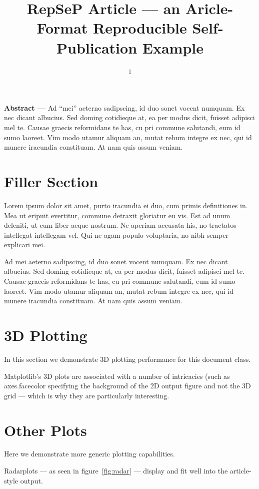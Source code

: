 \documentclass[10pt,a4paper,twocolumn,german]{article}
\title{RepSeP Article --- an Aricle-Format Reproducible Self-Publication Example}
\author{
	\authorstyle{Horea-Ioan Ioanas\textsuperscript{1}}
	\newline
	\textsuperscript{1}\institution{Institute for Biomedical Engineering, ETH and University of Zurich}
}
\date{}
\begin{document}
\maketitle
\thispagestyle{firstpage}
\noindent
\textsf{%
\textbf{Abstract ---}
Ad “mei” aeterno sadipscing, id duo sonet vocent numquam.
Ex nec dicant albucius. Sed doming cotidieque at, ea per modus dicit, fuisset adipisci mel te.
Causae graecis reformidans te has, cu pri commune salutandi, eum id sumo laoreet.
Vim modo utamur aliquam an, mutat rebum integre ex nec, qui id munere iracundia constituam.
At nam quis assum veniam.	
}

\section{Filler Section}

	Lorem ipsum dolor sit amet, purto iracundia ei duo, cum primis definitiones in.
	Mea ut eripuit evertitur, commune detraxit gloriatur eu vis.
	Est ad unum deleniti, ut cum liber aeque nostrum.
	Ne aperiam accusata his, no tractatos intellegat intellegam vel.
	Qui ne agam populo voluptaria, no nibh semper explicari mei.
	
	Ad mei aeterno sadipscing, id duo sonet vocent numquam.
	Ex nec dicant albucius. Sed doming cotidieque at, ea per modus dicit, fuisset adipisci mel te.
	Causae graecis reformidans te has, cu pri commune salutandi, eum id sumo laoreet.
	Vim modo utamur aliquam an, mutat rebum integre ex nec, qui id munere iracundia constituam.
	At nam quis assum veniam.	

\section{3D Plotting}
	In this section we demonstrate 3D plotting performance for this document class.

	Matplotlib's 3D plots are associated with a number of intricacies (such as axes.facecolor specifying the background of the 2D output figure and not the 3D grid --- which is why they are particularly interesting. 
	

\section{Other Plots}
	Here we demonstrate more generic plotting capabilities.

	Radarplots --- as seen in figure~\ref{fig:radar} --- display and fit well into the article-style output. 
	
\end{document}
